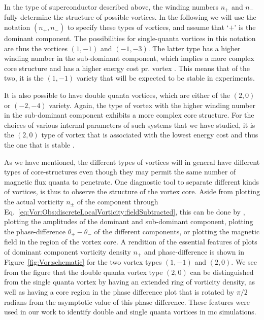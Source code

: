 In the type of superconductor described above, the winding numbers $n_+$ and $n_-$ fully determine the structure of possible vortices. In the following we will use the
notation $(n_+,n_-)$ to specify these types of vortices, and assume that `$+$' is the dominant component.
The possibilities for single-quanta vortices in this notation are thus the vortices $(1, -1)$ and $(-1,-3)$.
The latter type has a higher winding number in the sub-dominant component, which implies a more complex core structure and has a higher energy cost pr. vortex \cite{Garaud15}.
This means that of the two, it is the $(1, -1)$ variety that will be expected to be stable in experiments.

It is also possible to have double quanta vortices, which are either of the $(2, 0)$ or $(-2, -4)$ variety. Again, the type of vortex with the higher winding number in
the sub-dominant component exhibits a more complex core structure. For the choices of various internal parameters of such systems that we have studied, it is the $(2, 0)$
type of vortex that is associated with the lowest energy cost and thus the one that is stable \cite{AsleGaraud16,Garaud15,Sauls09}.

As we have mentioned, the different types of vortices will in general have different types of core-structures even though they may permit the same number of magnetic flux
quanta to penetrate. One diagnostic tool to separate different kinds of vortices, is thus to observe the structure of the vortex core. Aside from plotting the actual vorticity
$n_\pm$ of the component through Eq.~\eqref{eq:Vor:Obs:discreteLocalVorticity:fieldSubtracted}, this can be done by \eg, plotting
the amplitudes of the dominant and sub-dominant component, plotting the phase-difference $\theta_+-\theta_-$ of the different components, or plotting the magnetic field in the region of
the vortex core. A rendition of the essential features of plots of dominant component vorticity density $n_+$ and phase-difference is shown in Figure~\ref{fig:Vor:schematic} for the
two vortex types $(1,-1)$ and $(2,0)$. We see from the figure that the double quanta vortex type $(2,0)$ can be distinguished from the single quanta vortex by having an
extended ring of vorticity density, as well as having a core region in the phase difference plot that is rotated by $\pi/2$ radians from the asymptotic value of this phase difference.
These features were used in our work to identify double and single quanta vortices in \ac{mc} simulations.

